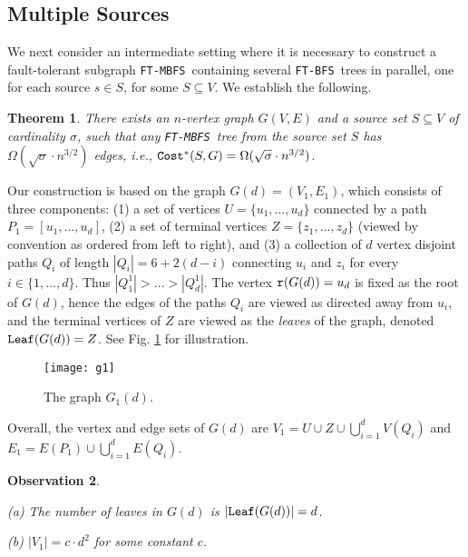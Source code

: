 \documentclass[12pt]{article}
\newtheorem{theorem}{Theorem}[section]
\newtheorem{observation}[theorem]{Observation}
\def\Cost{\mbox{\tt Cost}}
\def\Proof{\par\noindent{\bf Proof:~}}
\def\NSource{\sigma}
\def\Root{\mbox{\tt r}}
\def\Leaf{\mbox{\tt Leaf}}
\def\FTMBFS{\mbox{\tt FT-MBFS}}
\def\FTBFS{\mbox{\tt FT-BFS}}
\begin{document}
\subsection{Multiple Sources}
\label{sec:multiedge_lb}
We next consider an intermediate setting where it is necessary to construct
a fault-tolerant subgraph \FTMBFS\ containing several \FTBFS\ trees in parallel,
one for each source  $s \in S$, for some $S\subseteq V$.
We establish the following.
\begin{theorem}
\label{thm:lowerbound_f_multisource}
There exists an $n$-vertex graph $G(V, E)$ and a source set $S \subseteq V$
of cardinality $\NSource$, such that any \FTMBFS\ tree from
the source set $S$ has $\Omega(\sqrt{\NSource}\cdot n^{3/2})$ edges,
i.e., $\Cost^*(S,G)=\Omega(\sqrt{\NSource}\cdot n^{3/2})$.
\end{theorem}
\Proof
Our construction is based on the graph $G(d)=(V_1,E_1)$,
which consists of three components:
(1) a set of vertices $U=\{u_1,\ldots,u_d\}$ connected by a path
$P_1=[u_1, \ldots, u_d]$,
(2) a set of terminal vertices $Z=\{z_1,\ldots,z_d\}$
(viewed by convention as ordered from left to right),
and
(3) a collection of $d$ vertex disjoint paths $Q_{i}$ of length
$|Q_i|=6+2 (d-i)$ connecting $u_i$ and $z_i$
for every $i \in \{1, \ldots, d\}$.
Thus $|Q^1_1|> \ldots> |Q^1_d|$.
The vertex $\Root(G(d))=u_d$ is fixed as the root of $G(d)$, hence
the edges of the paths $Q_i$ are viewed as directed away from $u_i$,
and the terminal vertices of $Z$ are viewed as the \emph{leaves} of the graph,
denoted $\Leaf(G(d))=Z$.
See Fig. \ref{fig:lowerboundg1} for illustration.

\begin{figure}[h!]
\begin{center}
\texttt{[image: g1]}
\caption{\label{fig:lowerboundg1} The graph $G_1(d)$.}
\end{center}
\end{figure}

Overall, the vertex and edge sets of $G(d)$ are
$V_1=U \cup Z \cup \bigcup_{i=1}^d V(Q_i)$ and
$E_1=E(P_1) \cup \bigcup_{i=1}^d E(Q_i)$.

\begin{observation}
\label{obs:rel}
\begin{description}
\item{(a)}
The number of leaves in $G(d)$ is $|\Leaf(G(d))|=d$.
\item{(b)}
$|V_1|=c \cdot d^{2}$ for some constant $c$.
\end{description}
\end{observation}
\end{document}
